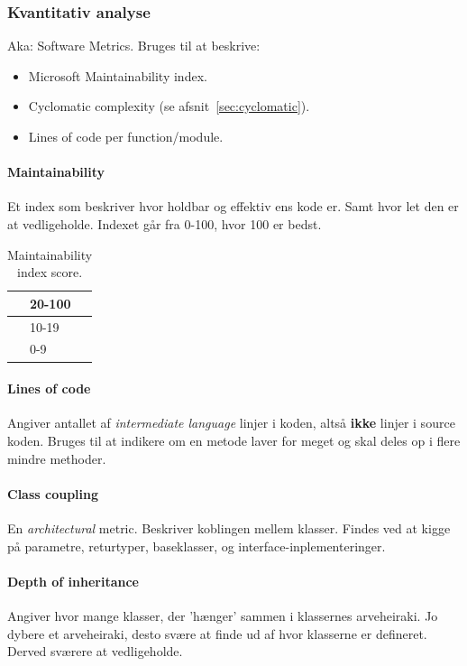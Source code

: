 \subsubsection{Kvantitativ analyse}
Aka: Software Metrics. Bruges til at beskrive: 

\begin{itemize}
	\item Microsoft Maintainability index.
	\item Cyclomatic complexity (se afsnit~\ref{sec:cyclomatic}).
	\item Lines of code per function/module.
\end{itemize}

\paragraph{Maintainability}
Et index som beskriver hvor holdbar og effektiv ens kode er. Samt hvor let den er at vedligeholde. Indexet går fra 0-100, hvor 100 er bedst.

\def\arraystretch{1.5}%
\begin{table}[H]
	\centering
	\begin{tabular}{|c|l|}
		\hline
		\hspace{2cm} \cellcolor{green}& 20-100\\
		\hline
		\cellcolor{yellow}& 10-19\\
		\hline
		\cellcolor{red}& 0-9\\
		\hline
	\end{tabular}
	\caption{Maintainability index score.}
\end{table}

\paragraph{Lines of code}
Angiver antallet af \textit{intermediate language} linjer i koden, altså \textbf{ikke} linjer i source koden. Bruges til at indikere om en metode laver for meget og skal deles op i flere mindre methoder.

\paragraph{Class coupling}
En \textit{architectural} metric. Beskriver koblingen mellem klasser. Findes ved at kigge på parametre, returtyper, baseklasser, og interface-inplementeringer.

\paragraph{Depth of inheritance}
Angiver hvor mange klasser, der 'hænger' sammen i klassernes arveheiraki. Jo dybere et arveheiraki, desto svære at finde ud af hvor klasserne er defineret. Derved sværere at vedligeholde.

